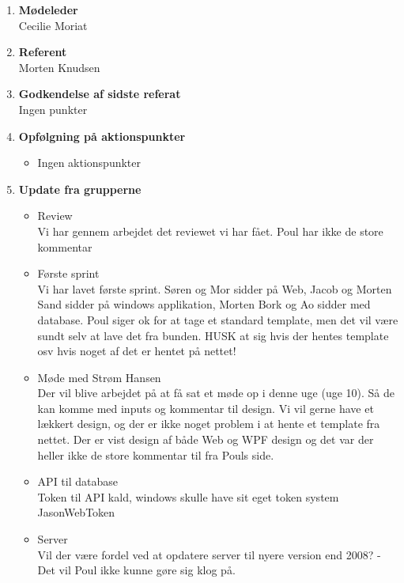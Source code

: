 	\begin{enumerate}
		\itemsep 0.3em 
		\item \textbf{Mødeleder}\\
			Cecilie Moriat
		\item \textbf{Referent}\\
			Morten Knudsen
		\item \textbf{Godkendelse af sidste referat}\\
			Ingen punkter
		\item\textbf{ Opfølgning på aktionspunkter}
		\begin{itemize}[-]
			\itemsep 0.3em 
				\item Ingen aktionspunkter
		\end{itemize}
		\item \textbf{Update fra grupperne}\\
			\begin{itemize}[-]
			\item Review\\
				Vi har gennem arbejdet det reviewet vi har fået. Poul har ikke de store kommentar
				
				\item Første sprint\\
				Vi har lavet første sprint. Søren og Mor sidder på Web, Jacob og Morten Sand sidder på windows applikation, Morten Bork og Ao sidder med database.
				Poul siger ok for at tage et standard template, men det vil være sundt selv at lave det fra bunden.
				HUSK at sig hvis der hentes template osv hvis noget af det er hentet på nettet!
				
				\item Møde med Strøm Hansen\\
				Der vil blive arbejdet på at få sat et møde op i denne uge (uge 10). Så de kan komme med inputs og kommentar til design.
				Vi vil gerne have et lækkert design, og der er ikke noget problem i at hente et template fra nettet.
				Der er vist design af både Web og WPF design og det var der heller ikke de store kommentar til fra Pouls side.
				
				\item API til database\\
				Token til API kald, windows skulle have sit eget token system
				JasonWebToken
				
				\item Server\\
				Vil der være fordel ved at opdatere server til nyere version end 2008?
				- Det vil Poul ikke kunne gøre sig klog på.
				

\end{itemize}
\end{enumerate}

